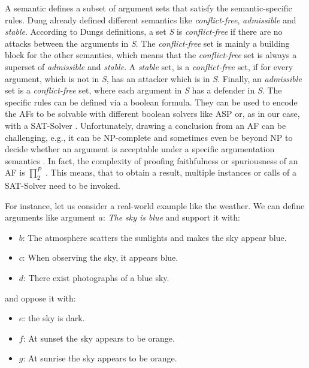 A semantic defines a subset of argument sets that satisfy the semantic-specific rules. Dung already defined different semantics \cite{Dung1995-DUNOTA-2} like \textit{conflict-free}, \textit{admissible} and \textit{stable}. According to Dungs definitions, a set \textit{S} is \textit{conflict-free} if there are no attacks between the arguments in \textit{S}. The \textit{conflict-free} set is mainly a building block for the other semantics, which means that the \textit{conflict-free} set is always a superset of \textit{admissible} and \textit{stable}. 
A \textit{stable} set, is a \textit{conflict-free} set, if for every argument, which is not in \textit{S}, has an attacker which is in \textit{S}. 
Finally, an \textit{admissible} set is a \textit{conflict-free} set, where each argument in \textit{S} has a defender in \textit{S}. 
The specific rules can be defined via a boolean formula. They can be used to encode the \acp{AF} to be solvable with different boolean solvers like \ac{ASP} \cite{DBLP:journals/corr/abs-1301-1388} or, as in our case, with a \ac{SAT-Solver} \cite{DBLP:journals/amai/AmgoudD13}. Unfortunately, drawing a conclusion from an AF can be challenging, e.g., it can be NP-complete and sometimes even be beyond NP to decide whether an argument is acceptable under a specific argumentation semantics \cite{DBLP:journals/ai/DvorakGRW23}. In fact, the complexity of proofing faithfulness or spuriousness of an \ac{AF} is $\prod_2^P$ \cite{DBLP:conf/kr/SaribaturW21}. This means, that to obtain a result, multiple instances or calls of a SAT-Solver need to be invoked. 


For instance, let us consider a real-world example like the weather. We can define arguments like argument $a$: \textit{The sky is blue} and support it with:
\begin{itemize}
    \item $b$: The atmosphere scatters the sunlights and makes the sky appear blue. 
    \item $c$: When observing the sky, it appears blue. 
    \item $d$: There exist photographs of a blue sky. 
\end{itemize}

and oppose it with:
\begin{itemize}
    \item $e$: the sky is dark. 
    \item $f$: At sunset the sky appears to be orange. 
    \item $g$: At sunrise the sky appears to be orange. 
\end{itemize}

